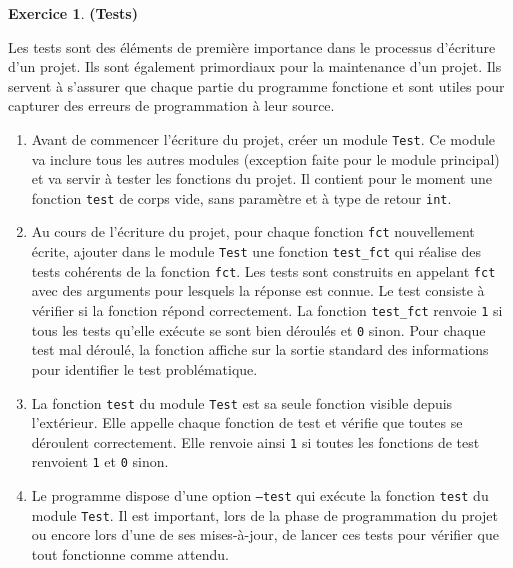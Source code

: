 \documentclass[12pt]{article}
\theoremstyle{definition}
\newtheorem{Exercice}{Exercice}
\begin{document}
\begin{Exercice} {\bf (Tests)}\smallskip
\label{exo:test}

Les tests sont des éléments de première importance dans le processus 
d'écriture d'un projet. Ils sont également primordiaux pour la maintenance
d'un projet. Ils servent à s'assurer que chaque partie du 
programme fonctione et sont utiles pour capturer des erreurs de 
programmation à leur source.
\smallskip

\begin{enumerate}
    \item Avant de commencer l'écriture du projet, créer un module 
    {\tt Test}. Ce module va inclure tous les autres modules (exception
    faite pour le module principal) et va servir à tester les fonctions
    du projet. Il contient pour le moment une fonction {\tt test} de 
    corps vide, sans paramètre et à type de retour {\tt int}.
    \smallskip
    
    \item Au cours de l'écriture du projet, pour chaque fonction {\tt fct}
    nouvellement écrite, ajouter dans le module {\tt Test} une fonction
    {\tt test\_fct} qui réalise des tests cohérents de la fonction {\tt fct}.
    Les tests sont construits en appelant {\tt fct} avec des 
    arguments pour lesquels la réponse est connue. Le test consiste à 
    vérifier si la fonction répond correctement. La fonction {\tt test\_fct}
    renvoie {\tt 1} si tous les tests qu'elle exécute se sont bien 
    déroulés et {\tt 0} sinon. Pour chaque test mal déroulé, la
    fonction affiche sur la sortie standard des informations pour identifier
    le test problématique.
    \smallskip
    
    \item La fonction {\tt test} du module {\tt Test} est sa seule 
    fonction visible depuis l'extérieur. Elle appelle chaque fonction 
    de test et vérifie que toutes se déroulent correctement. Elle renvoie
    ainsi {\tt 1} si toutes les fonctions de test renvoient {\tt 1} et
    {\tt 0} sinon.
    \smallskip
    
    \item Le programme dispose d'une option {\tt --test} qui exécute
    la fonction {\tt test} du module {\tt Test}. Il est important, lors 
    de la phase de programmation du projet ou encore lors d'une de ses 
    mises-à-jour, de lancer ces tests pour vérifier que tout fonctionne 
    comme attendu.
\end{enumerate}
\end{Exercice}
\bigskip
\end{document}
